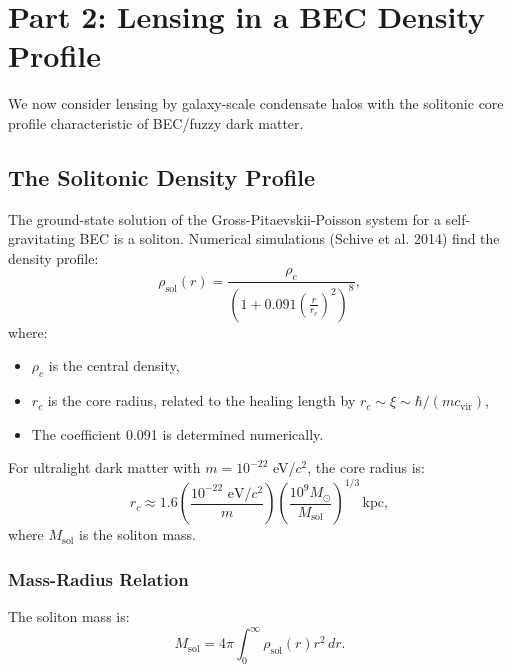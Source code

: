\documentclass[11pt,a4paper]{article}
\newcommand{\kpc}{\ensuremath{\mathrm{kpc}}}
\theoremstyle{definition}
\theoremstyle{remark}
\begin{document}
\section{Part 2: Lensing in a BEC Density Profile}
\label{sec:bec_lensing}

We now consider lensing by galaxy-scale condensate halos with the solitonic core profile characteristic of BEC/fuzzy dark matter.

\subsection{The Solitonic Density Profile}
\label{sec:solitonic_profile}

The ground-state solution of the Gross-Pitaevskii-Poisson system for a self-gravitating BEC is a soliton. Numerical simulations (Schive et al. 2014) find the density profile:
\begin{equation}
\label{eq:soliton_profile}
\rho_{\mathrm{sol}}(r) = \frac{\rho_c}{\left(1 + 0.091 \left(\frac{r}{r_c}\right)^2\right)^8},
\end{equation}
where:
\begin{itemize}[leftmargin=*, itemsep=0.2em]
\item $\rho_c$ is the central density,
\item $r_c$ is the core radius, related to the healing length by $r_c \sim \xi \sim \hbar/(m c_{\mathrm{vir}})$,
\item The coefficient 0.091 is determined numerically.
\end{itemize}

For ultralight dark matter with $m = 10^{-22}$ eV/$c^2$, the core radius is:
\begin{equation}
r_c \approx 1.6 \left(\frac{10^{-22} \text{ eV}/c^2}{m}\right) \left(\frac{10^9 M_\odot}{M_{\mathrm{sol}}}\right)^{1/3} \, \kpc,
\end{equation}
where $M_{\mathrm{sol}}$ is the soliton mass.

\subsubsection{Mass-Radius Relation}

The soliton mass is:
\begin{equation}
M_{\mathrm{sol}} = 4\pi \int_0^\infty \rho_{\mathrm{sol}}(r) r^2 \, dr.
\end{equation}
\end{document}
